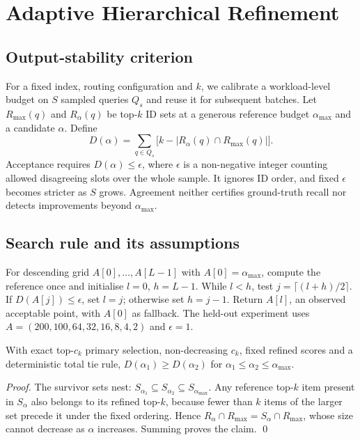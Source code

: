 \section{Adaptive Hierarchical Refinement}
\label{sec:method2}
\subsection{Output-stability criterion}
For a fixed index, routing configuration and $k$, we calibrate a workload-level
budget on $S$ sampled queries $Q_s$ and reuse it for subsequent batches. Let
$R_{\max}(q)$ and $R_\alpha(q)$ be top-$k$ ID sets at a generous reference
budget $\alpha_{\max}$ and a candidate $\alpha$. Define
\begin{equation}
D(\alpha)=\sum_{q\in Q_s}\bigl[k-|R_\alpha(q)\cap R_{\max}(q)|\bigr].
\label{eq:disagree}
\end{equation}
Acceptance requires $D(\alpha)\le\epsilon$, where $\epsilon$ is a non-negative integer
counting allowed disagreeing slots over the whole sample. It ignores ID order,
and fixed $\epsilon$ becomes stricter as $S$ grows. Agreement neither certifies
ground-truth recall nor detects improvements beyond $\alpha_{\max}$.

\subsection{Search rule and its assumptions}
\label{sec:mono}
For descending grid $A[0],\ldots,A[L-1]$ with $A[0]=\alpha_{\max}$, compute
the reference once and initialise $l=0$, $h=L-1$. While $l<h$, test
$j=\lceil(l+h)/2\rceil$. If $D(A[j])\le\epsilon$, set $l=j$; otherwise set
$h=j-1$. Return $A[l]$, an observed acceptable point, with $A[0]$ as fallback.
The held-out experiment uses $A=(200,100,64,32,16,8,4,2)$ and $\epsilon=1$.

\begin{proposition}
\label{prop:mono}
With exact top-$c_k$ primary selection, non-decreasing $c_k$, fixed refined
scores and a deterministic total tie rule,
$D(\alpha_1)\ge D(\alpha_2)$ for $\alpha_1\le\alpha_2\le\alpha_{\max}$.
\end{proposition}
\begin{proof}
The survivor sets nest: $S_{\alpha_1}\subseteq S_{\alpha_2}\subseteq
S_{\alpha_{\max}}$. Any reference top-$k$ item present in $S_\alpha$ also
belongs to its refined top-$k$, because fewer than $k$ items of the larger set
precede it under the fixed ordering. Hence
$R_\alpha\cap R_{\max}=S_\alpha\cap R_{\max}$, whose size cannot decrease
as $\alpha$ increases. Summing proves the claim. \qed
\end{proof}

